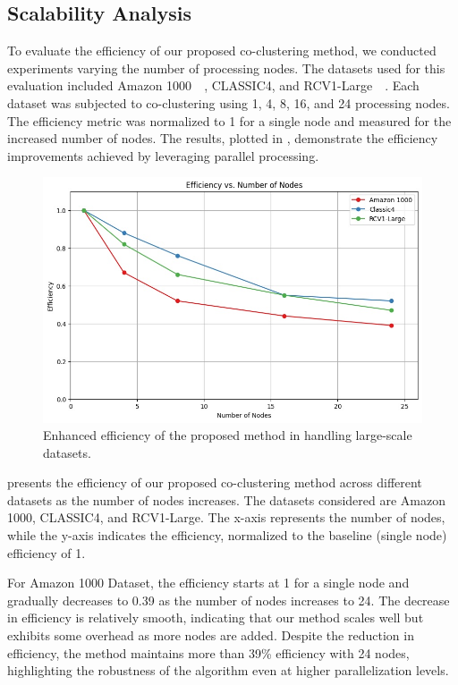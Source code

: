 \documentclass[journal]{IEEEtran}
\renewcommand{\cite}[1]{~\autocite{#1}}
\begin{document}
\subsection{Scalability Analysis}
To evaluate the efficiency of our proposed co-clustering method, we conducted experiments varying the number of processing nodes. The datasets used for this evaluation included Amazon 1000~\cite{ni2019JustifyingRecommendationsUsing}, CLASSIC4, and RCV1-Large~\cite{lewis2004Rcv1NewBenchmark}. Each dataset was subjected to co-clustering using 1, 4, 8, 16, and 24 processing nodes. The efficiency metric was normalized to 1 for a single node and measured for the increased number of nodes. The results, plotted in , demonstrate the efficiency improvements achieved by leveraging parallel processing.

\begin{figure}[htbp]
    \centering
    \includegraphics[width=0.8\linewidth]{efficiency.jpg}
    \caption{Enhanced efficiency of the proposed method in handling large-scale datasets.}
    \label{fig:efficiency}
\end{figure}

 presents the efficiency of our proposed co-clustering method across different datasets as the number of nodes increases. The datasets considered are Amazon 1000, CLASSIC4, and RCV1-Large. The x-axis represents the number of nodes, while the y-axis indicates the efficiency, normalized to the baseline (single node) efficiency of 1.


For Amazon 1000 Dataset, the efficiency starts at 1 for a single node and gradually decreases to 0.39 as the number of nodes increases to 24. The decrease in efficiency is relatively smooth, indicating that our method scales well but exhibits some overhead as more nodes are added. Despite the reduction in efficiency, the method maintains more than 39\% efficiency with 24 nodes, highlighting the robustness of the algorithm even at higher parallelization levels.
\end{document}
